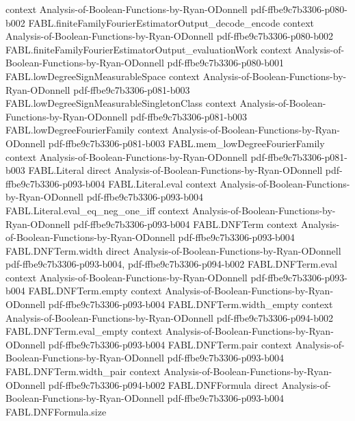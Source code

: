\begin{theorem}
  {context}
  {Analysis-of-Boolean-Functions-by-Ryan-ODonnell}
  {pdf-ffbe9c7b3306-p080-b002}
\proofstep
  {FABL.finiteFamilyFourierEstimatorOutput_decode_encode}
  {context}
  {Analysis-of-Boolean-Functions-by-Ryan-ODonnell}
  {pdf-ffbe9c7b3306-p080-b002}
\proofstep
  {FABL.finiteFamilyFourierEstimatorOutput_evaluationWork}
  {context}
  {Analysis-of-Boolean-Functions-by-Ryan-ODonnell}
  {pdf-ffbe9c7b3306-p080-b001}
\proofstep
  {FABL.lowDegreeSignMeasurableSpace}
  {context}
  {Analysis-of-Boolean-Functions-by-Ryan-ODonnell}
  {pdf-ffbe9c7b3306-p081-b003}
\proofstep
  {FABL.lowDegreeSignMeasurableSingletonClass}
  {context}
  {Analysis-of-Boolean-Functions-by-Ryan-ODonnell}
  {pdf-ffbe9c7b3306-p081-b003}
\proofstep
  {FABL.lowDegreeFourierFamily}
  {context}
  {Analysis-of-Boolean-Functions-by-Ryan-ODonnell}
  {pdf-ffbe9c7b3306-p081-b003}
\proofstep
  {FABL.mem_lowDegreeFourierFamily}
  {context}
  {Analysis-of-Boolean-Functions-by-Ryan-ODonnell}
  {pdf-ffbe9c7b3306-p081-b003}
\proofstep
  {FABL.Literal}
  {direct}
  {Analysis-of-Boolean-Functions-by-Ryan-ODonnell}
  {pdf-ffbe9c7b3306-p093-b004}
\proofstep
  {FABL.Literal.eval}
  {context}
  {Analysis-of-Boolean-Functions-by-Ryan-ODonnell}
  {pdf-ffbe9c7b3306-p093-b004}
\proofstep
  {FABL.Literal.eval_eq_neg_one_iff}
  {context}
  {Analysis-of-Boolean-Functions-by-Ryan-ODonnell}
  {pdf-ffbe9c7b3306-p093-b004}
\proofstep
  {FABL.DNFTerm}
  {context}
  {Analysis-of-Boolean-Functions-by-Ryan-ODonnell}
  {pdf-ffbe9c7b3306-p093-b004}
\proofstep
  {FABL.DNFTerm.width}
  {direct}
  {Analysis-of-Boolean-Functions-by-Ryan-ODonnell}
  {pdf-ffbe9c7b3306-p093-b004,
    pdf-ffbe9c7b3306-p094-b002}
\proofstep
  {FABL.DNFTerm.eval}
  {context}
  {Analysis-of-Boolean-Functions-by-Ryan-ODonnell}
  {pdf-ffbe9c7b3306-p093-b004}
\proofstep
  {FABL.DNFTerm.empty}
  {context}
  {Analysis-of-Boolean-Functions-by-Ryan-ODonnell}
  {pdf-ffbe9c7b3306-p093-b004}
\proofstep
  {FABL.DNFTerm.width_empty}
  {context}
  {Analysis-of-Boolean-Functions-by-Ryan-ODonnell}
  {pdf-ffbe9c7b3306-p094-b002}
\proofstep
  {FABL.DNFTerm.eval_empty}
  {context}
  {Analysis-of-Boolean-Functions-by-Ryan-ODonnell}
  {pdf-ffbe9c7b3306-p093-b004}
\proofstep
  {FABL.DNFTerm.pair}
  {context}
  {Analysis-of-Boolean-Functions-by-Ryan-ODonnell}
  {pdf-ffbe9c7b3306-p093-b004}
\proofstep
  {FABL.DNFTerm.width_pair}
  {context}
  {Analysis-of-Boolean-Functions-by-Ryan-ODonnell}
  {pdf-ffbe9c7b3306-p094-b002}
\proofstep
  {FABL.DNFFormula}
  {direct}
  {Analysis-of-Boolean-Functions-by-Ryan-ODonnell}
  {pdf-ffbe9c7b3306-p093-b004}
\proofstep
  {FABL.DNFFormula.size}

\end{theorem}
